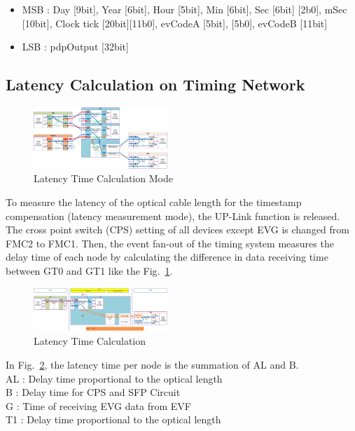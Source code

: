 \documentclass[journal,reqno]{IEEEtran}
\begin{document}
\begin{itemize}
	\item MSB :	Day [9bit], Year [6bit], Hour [5bit], Min [6bit], Sec [6bit] [2b0], mSec [10bit], Clock tick [20bit][11b0], evCodeA [5bit], [5b0], evCodeB [11bit]
	\item LSB :	pdpOutput [32bit]
\end{itemize}

\subsection{Latency Calculation on Timing Network}
\begin{figure}[!htb]
	\centering
	\includegraphics*[width=0.45\textwidth, height=0.3\textwidth]{img15.png}
	\caption{Latency Time Calculation Mode}
	\label{latency_time_mode}
\end{figure}
To measure the latency of the optical cable length for the timestamp compensation (latency measurement mode), the UP-Link function is released. The cross point switch (CPS) setting of all devices except EVG is changed from FMC2 to FMC1. Then, the event fan-out of the timing system measures the delay time of each node by calculating the difference in data receiving time between GT0 and GT1 like the Fig.~\ref{latency_time_mode}.

\begin{figure}[!htb]
	\centering
	\includegraphics*[width=0.45\textwidth, height=0.23\textwidth]{img16.png}
	\caption{Latency Time Calculation}
	\label{latency_time}
\end{figure}
In Fig.~\ref{latency_time}, the latency time per node is the summation of AL and B.\\
\noindent
AL : Delay time proportional to the optical length\\
\space B  : Delay time for CPS and SFP Circuit \\
\space G  : Time of receiving EVG data from EVF \\
\space T1 : Delay time proportional to the optical length
\end{document}

